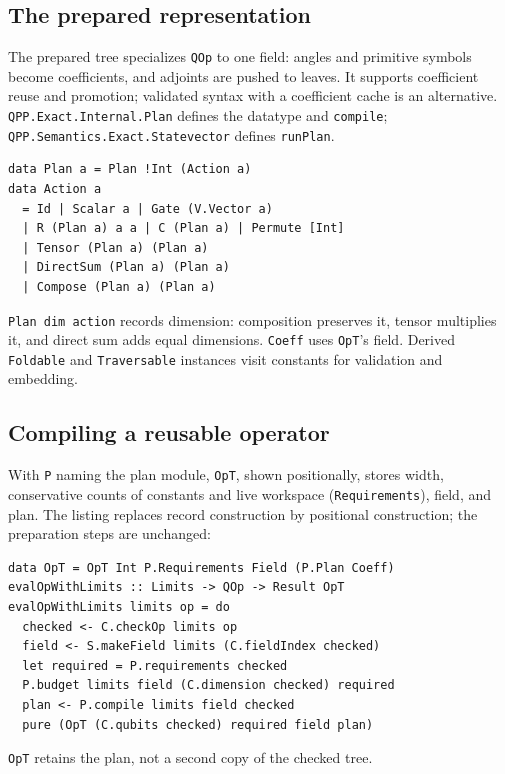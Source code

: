 \documentclass[11pt,a4paper]{article}
\newcommand{\code}[1]{\texttt{#1}}
\begin{document}
\subsection{The prepared representation}
\label{sec:plans}
The prepared tree specializes \code{QOp} to one field: angles and primitive
symbols become coefficients, and adjoints are pushed to leaves.
It supports coefficient reuse and promotion; validated syntax with a
coefficient cache is an alternative.
\code{QPP.Exact.Internal.Plan} defines the datatype and \code{compile};
\code{QPP.Semantics.Exact.Statevector} defines \code{runPlan}.
\begin{lstlisting}[label=lst:plan-type]
data Plan a = Plan !Int (Action a)
data Action a
  = Id | Scalar a | Gate (V.Vector a)
  | R (Plan a) a a | C (Plan a) | Permute [Int]
  | Tensor (Plan a) (Plan a)
  | DirectSum (Plan a) (Plan a)
  | Compose (Plan a) (Plan a)
\end{lstlisting}
\code{Plan dim action} records dimension: composition preserves it,
tensor multiplies it, and direct sum adds equal dimensions. \code{Coeff}
uses \code{OpT}'s field. Derived \code{Foldable} and \code{Traversable}
instances visit constants for validation and embedding.

\subsection{Compiling a reusable operator}
With \code{P} naming the plan module, \code{OpT}, shown positionally,
stores width, conservative
counts of constants and live workspace (\code{Requirements}), field, and
plan. The listing replaces record construction by positional construction;
the preparation steps are unchanged:
\begin{lstlisting}[label=lst:plan-evalop,breaklines=true]
data OpT = OpT Int P.Requirements Field (P.Plan Coeff)
evalOpWithLimits :: Limits -> QOp -> Result OpT
evalOpWithLimits limits op = do
  checked <- C.checkOp limits op
  field <- S.makeField limits (C.fieldIndex checked)
  let required = P.requirements checked
  P.budget limits field (C.dimension checked) required
  plan <- P.compile limits field checked
  pure (OpT (C.qubits checked) required field plan)
\end{lstlisting}
\code{OpT} retains the plan, not a second copy of the checked tree.
\end{document}
